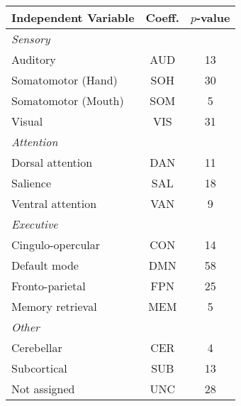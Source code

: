 \begin{tabular}{lcc}
\toprule 
Independent Variable & Coeff. & $p$-value \\ 
\midrule 
\textit{Sensory} & & \\
	\hspace{3pt}Auditory  			&  AUD & 13 \\ 
	\hspace{3pt}Somatomotor (Hand)	&  SOH & 30 \\
	\hspace{3pt}Somatomotor (Mouth)	&  SOM & 5 \\
	\hspace{3pt}Visual	 			&  VIS & 31 \\ 
\textit{Attention} & & \\
	\hspace{3pt}Dorsal attention  	&  DAN & 11	\\ 
	\hspace{3pt}Salience		  	&  SAL & 18 \\ 
	\hspace{3pt}Ventral attention  	&  VAN & 9 \\ 
\textit{Executive} & & \\
	\hspace{3pt}Cingulo-opercular 	& CON & 14 \\ 
	\hspace{3pt}Default mode		& DMN & 58 \\
	\hspace{3pt}Fronto-parietal  	& FPN & 25 \\ 
	\hspace{3pt}Memory retrieval	& MEM & 5 \\
\textit{Other} & & \\
	\hspace{3pt}Cerebellar			& CER & 4  \\
	\hspace{3pt}Subcortical			& SUB & 13 \\
	\hspace{3pt}Not assigned 		& UNC & 28 \\ 
\bottomrule 
\end{tabular}